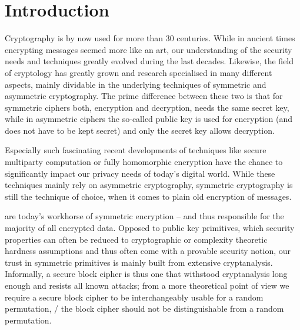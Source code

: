 \chapter{Introduction}

Cryptography is by now used for more than 30 centuries.
While in ancient times encrypting messages seemed more like an art, our understanding of the security needs and techniques greatly evolved during the last decades.
Likewise, the field of cryptology has greatly grown and research specialised in many different aspects, mainly dividable in the underlying techniques of symmetric and asymmetric cryptography.
The prime difference between these two is that for symmetric ciphers both, encryption and decryption, needs the same secret key, while in asymmetric ciphers the so-called public key is used for encryption (and does not have to be kept secret) and only the secret key allows decryption.

Especially such fascinating recent developments of techniques like secure multiparty computation or fully homomorphic encryption have the chance to significantly impact our privacy needs of today's digital world.
While these techniques mainly rely on asymmetric cryptography, symmetric cryptography is still the technique of choice, when it comes to plain old encryption of messages.

\hspace{1.5em} are today's workhorse of symmetric encryption
-- and thus responsible for the majority of all encrypted data.
Opposed to public key primitives, which security properties can often be reduced to cryptographic or complexity theoretic hardness assumptions and thus often come with a provable security notion, our trust in symmetric primitives is mainly built from extensive cryptanalysis.
Informally, a secure block cipher is thus one that withstood cryptanalysis long enough and resists all known attacks; from a more theoretical point of view we require a secure block cipher to be interchangeably usable for a random permutation, \ie/ the block cipher should not be distinguishable from a random permutation.

